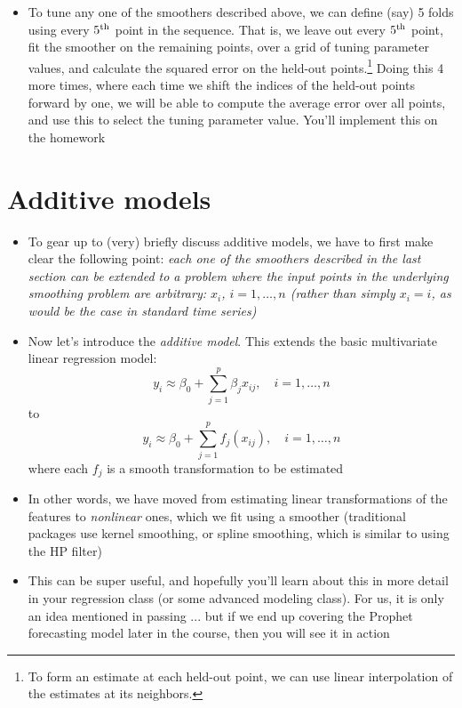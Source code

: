 \documentclass{article}
\begin{document}
\begin{itemize}
\item To tune any one of the smoothers described above, we can define (say) 5
  folds using every $5^{\textnormal{th}}$ point in the sequence. That is, we leave out every
  $5^{\textnormal{th}}$ point, fit the smoother on the remaining points, over a grid of tuning 
  parameter values, and calculate the squared error on the held-out
  points.\footnote{To form an estimate at each held-out point, we can use
    linear interpolation of the estimates at its neighbors.} 
  Doing this 4 more times, where each time we shift the indices of the held-out
  points forward by one, we will be able to compute the average error over all
  points, and use this to select the tuning parameter value. You'll implement
  this on the homework  
\end{itemize}

\section{Additive models}

\begin{itemize}
\item To gear up to (very) briefly discuss additive models, we have to first
  make clear the following point: \emph{each one of the smoothers described in
    the last section can be extended to a problem where the input points in the
    underlying smoothing problem are arbitrary: $x_i$, $i = 1,\dots,n$ (rather
    than simply $x_i = i$, as would be the case in standard time series)}

\item Now let's introduce the \emph{additive model}. This extends the basic
  multivariate linear regression model:
  \[
  y_i \approx \beta_0 + \sum_{j=1}^p \beta_j x_{ij}, \quad i = 1,\dots,n
  \]
  to 
  \[
  y_i \approx \beta_0 + \sum_{j=1}^p f_j(x_{ij}), \quad i = 1,\dots,n
  \]
  where each $f_j$ is a smooth transformation to be estimated

\item In other words, we have moved from estimating linear transformations of
  the features to \emph{nonlinear} ones, which we fit using a smoother
  (traditional packages use kernel smoothing, or spline smoothing, which is
  similar to using the HP filter) 

\item This can be super useful, and hopefully you'll learn about this in more
  detail in your regression class (or some advanced modeling class). For us, it
  is only an idea mentioned in passing ... but if we end up covering the Prophet 
  forecasting model later in the course, then you will see it in action 
\end{itemize}
\end{document}
